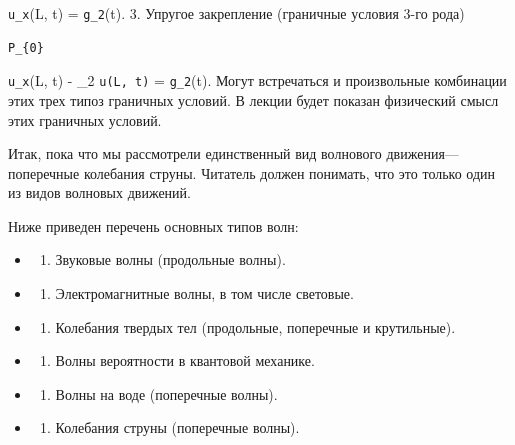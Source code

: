 \documentclass[
  ukrainian,
]{article}
\providecommand{\tightlist}{%
  \setlength{\itemsep}{0pt}\setlength{\parskip}{0pt}}
\begin{document}
\texttt{u\_x}(L, t) = \texttt{g\_2}(t). 3. Упругое закрепление
(граничные условия 3-го рода)

\begin{verbatim}
P_{0}
\end{verbatim}

\texttt{u\_x}(L, t) - \gamma\_2 \texttt{u(L,\ t)} = \texttt{g\_2}(t).
Могут встречаться и произвольные комбинации этих трех типоз граничных
условий. В лекции будет показан физический смысл этих граничных условий.

Итак, пока что мы рассмотрели единственный вид волнового
движения---поперечные колебания струны. Читатель должен понимать, что
это только один из видов волновых движений.

Ниже приведен перечень основных типов волн:

\begin{itemize}
\tightlist
\item
  \begin{enumerate}
  \def\labelenumi{\arabic{enumi}.}
  \tightlist
  \item
    Звуковые волны (продольные волны).
  \end{enumerate}
\item
  \begin{enumerate}
  \def\labelenumi{\arabic{enumi}.}
  \setcounter{enumi}{1}
  \tightlist
  \item
    Электромагнитные волны, в том числе световые.
  \end{enumerate}
\item
  \begin{enumerate}
  \def\labelenumi{\arabic{enumi}.}
  \setcounter{enumi}{2}
  \tightlist
  \item
    Колебания твердых тел (продольные, поперечные и крутильные).
  \end{enumerate}
\item
  \begin{enumerate}
  \def\labelenumi{\arabic{enumi}.}
  \setcounter{enumi}{3}
  \tightlist
  \item
    Волны вероятности в квантовой механике.
  \end{enumerate}
\item
  \begin{enumerate}
  \def\labelenumi{\arabic{enumi}.}
  \setcounter{enumi}{4}
  \tightlist
  \item
    Волны на воде (поперечные волны).
  \end{enumerate}
\item
  \begin{enumerate}
  \def\labelenumi{\arabic{enumi}.}
  \setcounter{enumi}{5}
  \tightlist
  \item
    Колебания струны (поперечные волны).
  \end{enumerate}
\end{itemize}
\end{document}

